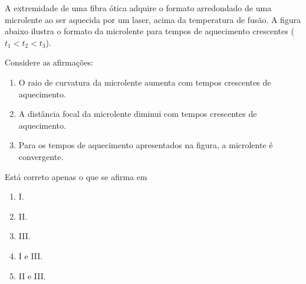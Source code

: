 \documentclass[twocolumn,landscape]{amsart}
\begin{document}
\begin{questao}
  A extremidade de uma fibra ótica adquire o formato arredondado de uma
  microlente ao ser aquecida por um laser, acima da temperatura de
  fusão. A figura abaixo ilustra o formato da microlente para tempos de
  aquecimento crescentes ($t_1<t_2<t_3$).

  Considere as afirmações:

  \begin{enumerate}[\bf I.]
    \item O raio de curvatura da microlente aumenta com
    tempos crescentes de aquecimento.
    \item A distância focal da microlente diminui com tempos
    crescentes de aquecimento.
    \item Para os tempos de aquecimento apresentados na
    figura, a microlente é convergente.
  \end{enumerate}

  Está correto apenas o que se afirma em

  \begin{enumerate}[\bf a.]
    \item I.
    \item II.
    \item III.
    \item I e III.
    \item II e III. %
  \end{enumerate}
\end{questao}
\clearpage
\end{document}
